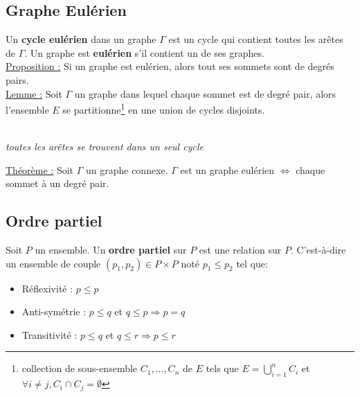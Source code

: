 \documentclass[11pt]{article}
\begin{document}
	\subsection{Graphe Eulérien}
		Un \textbf{cycle eulérien} dans un graphe $\Gamma$ est un cycle qui contient toutes les arêtes de $\Gamma$. Un graphe est \textbf{eulérien} s'il contient un de ses graphes.\\
		
		\underline{Proposition :} Si un graphe est eulérien, alors tout ses sommets sont de degrés pairs.\\
		
		\underline{Lemme :} Soit $\Gamma$ un graphe dans lequel chaque sommet est de degré pair, alors l'ensemble $E$ se partitionne\footnote{collection de sous-ensemble $C_1, ..., C_n$ de $E$ tels que $E=\displaystyle\bigcup^n_{i=1} C_i$ et $\forall i \neq j, C_i \cap C_j = \emptyset$} en une union de cycles disjoints.\\
		\begin{center}
			 \\
				\textit{toutes les arêtes se trouvent dans un seul cycle}
			\end{center} 
			
	\underline{Théorème :}  Soit $\Gamma$ un graphe connexe. $\Gamma$ est un graphe eulérien $\Leftrightarrow$ chaque sommet à un degré pair.
	
	\subsection{Ordre partiel}
		Soit $P$ un ensemble. Un \textbf{ordre partiel} sur $P$ est une relation sur $P$. C'est-à-dire un ensemble de couple $(p_1,p_2) \in P \times P$ noté $p_1 \leq p_2$ tel que:
		\begin{itemize}
			\item Réflexivité : $p \leq p$
			\item Anti-symétrie : $p \leq q$ et $q \leq p \Rightarrow p = q$
			\item Transitivité : $p \leq q$ et $q \leq r \Rightarrow p \leq r$
		\end{itemize}
\end{document}
